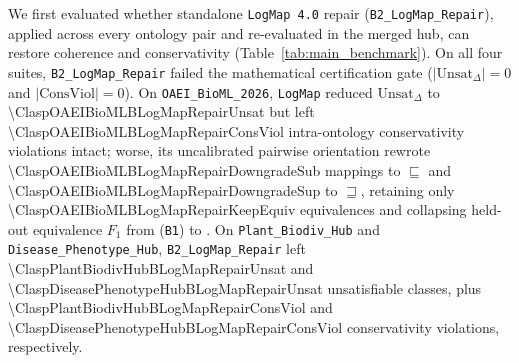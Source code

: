 \documentclass[10pt]{article}
\theoremstyle{accentdef}
\begin{document}
We first evaluated whether standalone \texttt{LogMap~4.0} repair (\texttt{B2\_LogMap\_Repair}), applied across every ontology pair and re-evaluated in the merged hub, can restore coherence and conservativity (Table~\ref{tab:main_benchmark}). On all four suites, \texttt{B2\_LogMap\_Repair} failed the mathematical certification gate ($|\mathrm{Unsat}_{\Delta}| = 0$ and $|\mathrm{ConsViol}| = 0$). On \texttt{OAEI\_BioML\_2026}, \texttt{LogMap} reduced $\mathrm{Unsat}_{\Delta}$ to \num{\ClaspOAEIBioMLBLogMapRepairUnsat} but left \num{\ClaspOAEIBioMLBLogMapRepairConsViol} intra-ontology conservativity violations intact; worse, its uncalibrated pairwise orientation rewrote \num{\ClaspOAEIBioMLBLogMapRepairDowngradeSub} mappings to $\sqsubseteq$ and \num{\ClaspOAEIBioMLBLogMapRepairDowngradeSup} to $\sqsupseteq$, retaining only \num{\ClaspOAEIBioMLBLogMapRepairKeepEquiv} equivalences and collapsing held-out equivalence $F_1$ from \ClaspOAEIBioMLBRawHubEquivFone{} (\texttt{B1}) to \ClaspOAEIBioMLBLogMapRepairEquivFone{}. On \texttt{Plant\_Biodiv\_Hub} and \texttt{Disease\_Phenotype\_Hub}, \texttt{B2\_LogMap\_Repair} left \num{\ClaspPlantBiodivHubBLogMapRepairUnsat} and \num{\ClaspDiseasePhenotypeHubBLogMapRepairUnsat} unsatisfiable classes, plus \num{\ClaspPlantBiodivHubBLogMapRepairConsViol} and \num{\ClaspDiseasePhenotypeHubBLogMapRepairConsViol} conservativity violations, respectively.
\end{document}
